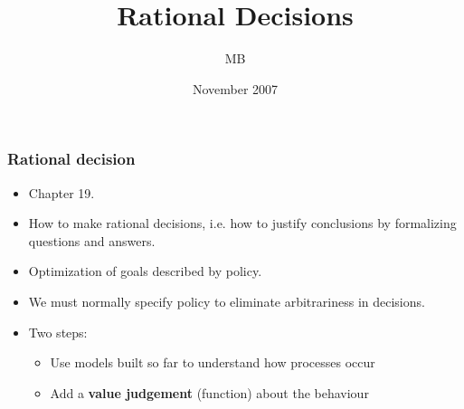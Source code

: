 \documentclass{beamer}
\title[Game Theory...] %
{Rational Decisions}
\author[] %
{MB}
\institute[Oslo University College] %
{
  Department of Computer Science\\
  Oslo Univeristy College
}
\date[MS007A] %
{November 2007}
\begin{document}
\begin{frame}
  \titlepage
\end{frame}


\begin{frame}
\frametitle{Rational decision}

\begin{itemize}
\item Chapter 19.\vspace{0.2cm}

\item How to make rational decisions, i.e. how to justify conclusions
by formalizing questions and answers.\vspace{0.2cm}

\item Optimization of goals described by policy.\vspace{0.2cm}

\item We must normally specify 
policy to eliminate arbitrariness in decisions.\vspace{0.2cm}

\item Two steps:\vspace{0.2cm}
\begin{itemize}
\item Use models built so far to understand how processes occur
\item Add a {\bf value judgement} (function) about the behaviour
\end{itemize}
\end{itemize}
\end{frame}

\end{document}

